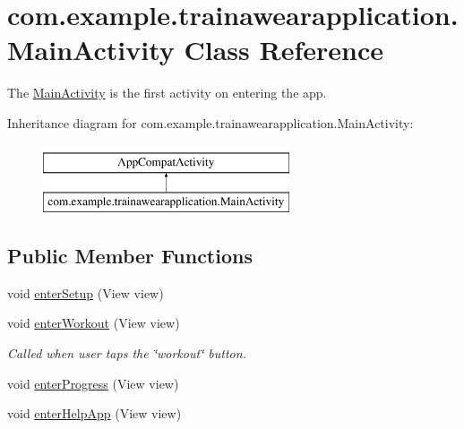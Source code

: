 \hypertarget{classcom_1_1example_1_1trainawearapplication_1_1_main_activity}{}\section{com.\+example.\+trainawearapplication.\+Main\+Activity Class Reference}
\label{classcom_1_1example_1_1trainawearapplication_1_1_main_activity}


The \mbox{\hyperlink{classcom_1_1example_1_1trainawearapplication_1_1_main_activity}{Main\+Activity}} is the first activity on entering the app.  


Inheritance diagram for com.\+example.\+trainawearapplication.\+Main\+Activity\+:\begin{figure}[H]
\begin{center}
\leavevmode
\includegraphics[height=2.000000cm]{classcom_1_1example_1_1trainawearapplication_1_1_main_activity}
\end{center}
\end{figure}
\subsection*{Public Member Functions}
\begin{DoxyCompactItemize}
\item 
void \mbox{\hyperlink{classcom_1_1example_1_1trainawearapplication_1_1_main_activity_aeb1226f930e5d26a0aa04fc7614f3618}{enter\+Setup}} (View view)
\item 
void \mbox{\hyperlink{classcom_1_1example_1_1trainawearapplication_1_1_main_activity_a1f9bee72c098b97dc196ab9b9af6fe00}{enter\+Workout}} (View view)
\begin{DoxyCompactList}\small\item\em Called when user taps the \char`\"{}workout\char`\"{} button. \end{DoxyCompactList}\item 
void \mbox{\hyperlink{classcom_1_1example_1_1trainawearapplication_1_1_main_activity_a981791c0f63196acc0294ea82e1ff73a}{enter\+Progress}} (View view)
\item 
void \mbox{\hyperlink{classcom_1_1example_1_1trainawearapplication_1_1_main_activity_a8f0652f7fc7f760d577d47b9ee3f9886}{enter\+Help\+App}} (View view)
\end{DoxyCompactItemize}
